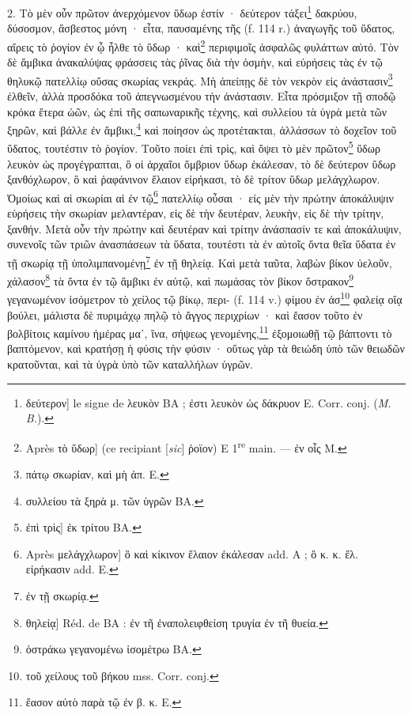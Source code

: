 \documentclass[landscape, a4paper, 11pt, oneside, polutonikogreek, french]{article}
\begin{document}
2. Τὸ μὲν οὖν πρῶτον ἀνερχόμενον ὕδωρ ἐστίν · δεύτερον τάξει\footnote{δεύτερον] le signe de λευκὸν BA ; ἐστι λευκὸν ὡς δάκρυον E. Corr. conj. (\emph{M. B.}).} δακρύου, δύσοσμον, ἄσβεστος μόνη · εἶτα, παυσαμένης τῆς (f. 114 r.) ἀναγωγῆς τοῦ ὕδατος, αἴρεις τὸ ῥογίον ἐν ᾦ ἦλθε τὸ ὕδωρ · καὶ\footnote{Après τὸ ὕδωρ] (ce recipiant [\emph{sic}] ῥοϊον) E 1\textsuperscript{re} main. --- ἐν οἷς M.} περιφιμοῖς ἀσφαλῶς φυλάττων αὐτό. Τὸν δὲ ἄμβικα ἀνακαλύψας φράσσεις τὰς ῥῖνας διὰ τὴν ὀσμὴν, καὶ εὑρήσεις τὰς ἐν τῷ θηλυκῷ πατελλίῳ οὔσας σκωρίας νεκράς. Μὴ ἀπείπῃς δὲ τὸν νεκρὸν εἰς ἀνάστασιν\footnote{πάτῳ σκωρίαν, καὶ μὴ ἀπ. E.} ἐλθεῖν, ἀλλὰ προσδόκα τοῦ ἀπεγνωσμένου τὴν ἀνάστασιν. Εἶτα πρόσμιξον τῇ σποδῷ κρόκα ἕτερα ὠῶν, ὡς ἐπὶ τῆς σαπωναρικῆς τέχνης, καὶ συλλείου τὰ ὑγρὰ μετὰ τῶν ξηρῶν, καὶ βάλλε ἐν ἄμβικι,\footnote{συλλείου τὰ ξηρὰ μ. τῶν ὑγρῶν BA.} καὶ ποίησον ὠς προτέτακται, ἀλλάσσων τὸ δοχεῖον τοῦ ὕδατος, τουτέστιν τὸ ῥογίον. Τοῦτο ποίει ἐπὶ τρὶς, καὶ ὄψει τὸ μὲν πρῶτον\footnote{ἐπὶ τρὶς] ἐκ τρίτου BA.} ὕδωρ λευκὸν ὡς προγέγραπται, ὃ οἱ ἀρχαῖοι ὄμβριον ὕδωρ ἐκάλεσαν, τὸ δὲ δεύτερον ὕδωρ ξανθόχλωρον, ὃ καὶ ῥαφάνινον ἔλαιον εἰρήκασι, τὸ δὲ τρίτον ὕδωρ μελάγχλωρον. Ὀμοίως καὶ αἱ σκωρίαι αἱ ἐν τῷ\footnote{Après μελάγχλωρον] ὃ καὶ κίκινον ἔλαιον ἐκάλεσαν add. A ; ὃ κ. κ. ἔλ. εἰρήκασιν add. E.} πατελλίῳ οὖσαι · εἰς μὲν τὴν πρώτην ἀποκάλυψιν εὑρήσεις τὴν σκωρίαν μελαντέραν, εἰς δὲ τὴν δευτέραν, λευκὴν, εἰς δὲ τὴν τρίτην, ξανθήν. Μετὰ οὖν τὴν πρώτην καὶ δευτέραν καὶ τρίτην ἀνάσπασίν τε καὶ ἀποκάλυψιν, συνενοῖς τῶν τριῶν ἀνασπάσεων τὰ ὕδατα, τουτέστι τὰ ἐν αὐτοῖς ὄντα θεῖα ὕδατα ἐν τῇ σκωρίᾳ τῇ ὑπολιμπανομένῃ\footnote{ἐν τῇ σκωρίᾳ.} ἐν τῇ θηλείᾳ. Καὶ μετὰ ταῦτα, λαβὼν βίκον ὑελοῦν, χάλασον\footnote{θηλείᾳ] Réd. de BA : ἐν τῆ ἐναπολειφθείση τρυγία ἐν τῆ θυεία.} τὰ ὄντα ἐν τῷ ἄμβικι ἐν αὐτῷ, καὶ πωμάσας τὸν βίκον ὄστρακον\footnote{ὀστράκω γεγανομένω ἰσομέτρω BA.} γεγανωμένον ἰσόμετρον τὸ χείλος τῷ βίκῳ, περι- (f. 114 v.) φίμου ἐν ἀσ\footnote{τοῦ χείλους τοῦ βήκου mss. Corr. conj.} φαλείᾳ οἵᾳ βούλει, μάλιστα δὲ πυριμάχῳ πηλῷ τὸ ἄγγος περιχρίων · καὶ ἔασον τοῦτο ἐν βολβίτοις καμίνου ἡμέρας μαʹ, ἵνα, σήψεως γενομένης,\footnote{ἔασον αὐτὸ παρὰ τῷ ἐν β. κ. E.} ἐξομοιωθῇ τῷ βάπτοντι τὸ βαπτόμενον, καὶ κρατήσῃ ἡ φύσις τὴν φύσιν · οὕτως γὰρ τὰ θειώδη ὑπὸ τῶν θειωδῶν κρατοῦνται, καὶ τὰ ὑγρὰ ὑπὸ τῶν καταλλήλων ὑγρῶν.
\end{document}
